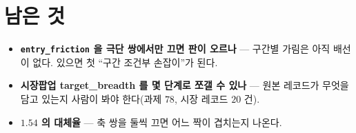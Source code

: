 \documentclass[11pt]{article}
\begin{document}
\section*{남은 것}

\begin{itemize}
\item \textbf{\texttt{entry\_friction} 을 극단 쌍에서만 끄면 판이 오르나} ---
구간별 가림은 아직 배선이 없다. 있으면 첫 ``구간 조건부 손잡이''가 된다.
\item \textbf{시장팝업 target\_breadth 를 몇 단계로 쪼갤 수 있나} --- 원본
레코드가 무엇을 담고 있는지 사람이 봐야 한다(과제 $78$, 시장 레코드 $20$ 건).
\item \textbf{$1.54$ 의 대체율} --- 축 쌍을 둘씩 끄면 어느 짝이 겹치는지 나온다.
\end{itemize}
\end{document}
